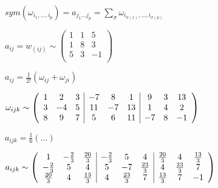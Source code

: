 \documentclass{book}
\theoremstyle{definition}
\begin{document}
$sym(\omega_{i_1 , \ldots, i_p}) = a_{j_1 \ldots j_p} = \sum_{\sigma}\omega_{i_{\sigma(1)}, \ldots, i_{\sigma(p)}}$

$a_{ij} = w_{(ij)} \sim \begin{pmatrix} 1 & 1 & 5\\ 1& 8 & 3\\5 &3 & -1\\ \end{pmatrix} $ 

$a_{ij} = \frac{1}{2!}(\omega_{ij} + \omega_{ji})$

$\omega_{ijk} \sim \left( 
    \begin{array}{c c c | c c c| c c c}
        1 & 2 & 3 & -7 & 8 & 1 & 9 & 3 & 13\\
        3 & -4 & 5 & 11 & -7 & 13 & 1 & 4 & 2\\
        8 & 9 & 7 & 5 & 6 & 11 & -7 & 8 & -1\\
\end{array}
\right) $


$a_{ijk} = \frac{1}{6}\left( \ldots \right) $ 

$a_{ijk} \sim \left( 
    \begin{array} {c c c| c c c| c c c}
        1 & -\frac{2}{3} & \frac{20}{3} & -\frac{2}{3} & 5 & 4 & \frac{20}{3} &4 & \frac{13}{3}\\
        -\frac{2}{3} & 5 & 4 & 5 & -7 & \frac{23}{3} & 4& \frac{23}{3} & 7 \\
        \frac{20}{3} &4 & \frac{13}{3} &4 &\frac{23}{3} &7& \frac{13}{3} &7 & -1\\
    
\end{array}
\right) $
\end{document}
